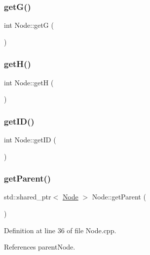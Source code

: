 \subsubsection{\texorpdfstring{get\+G()}{getG()}}
{\footnotesize\ttfamily int Node\+::getG (\begin{DoxyParamCaption}{ }\end{DoxyParamCaption})}

\mbox{\label{class_node_a1108111505a673b217d5e13d6ac36d14}} 
\subsubsection{\texorpdfstring{get\+H()}{getH()}}
{\footnotesize\ttfamily int Node\+::getH (\begin{DoxyParamCaption}{ }\end{DoxyParamCaption})}

\mbox{\label{class_node_a8dd9a1d6ac9638fd1168283ad47e5127}} 
\subsubsection{\texorpdfstring{get\+I\+D()}{getID()}}
{\footnotesize\ttfamily int Node\+::get\+ID (\begin{DoxyParamCaption}{ }\end{DoxyParamCaption})}

\mbox{\label{class_node_a5a7ffc7ca51647866a2d458cc8b42e00}} 
\subsubsection{\texorpdfstring{get\+Parent()}{getParent()}}
{\footnotesize\ttfamily std\+::shared\+\_\+ptr$<$ \hyperlink{class_node}{Node} $>$ Node\+::get\+Parent (\begin{DoxyParamCaption}{ }\end{DoxyParamCaption})}



Definition at line 36 of file Node.\+cpp.



References parent\+Node.


